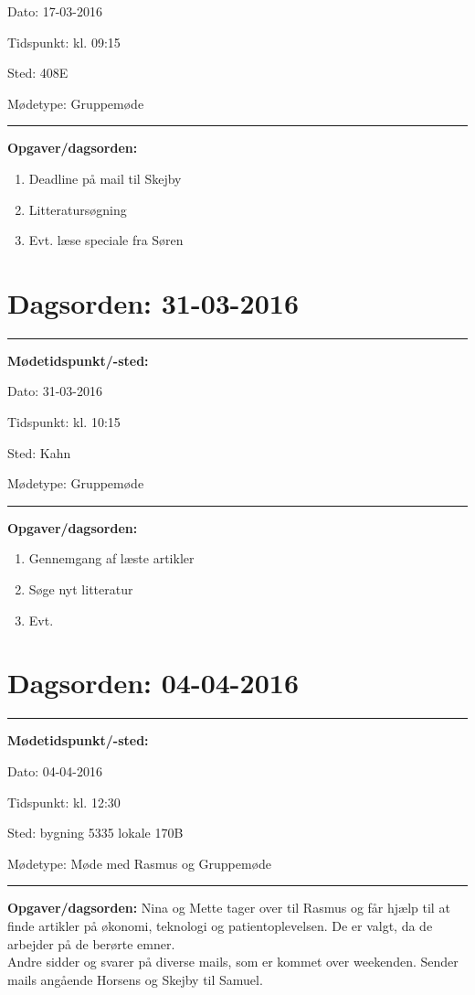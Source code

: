Dato: \tabto{7em} 17-03-2016

Tidspunkt: \tabto{7em} kl. 09:15 

Sted: \tabto{7em} 408E

Mødetype: \tabto{7em} Gruppemøde \newline


\hrule
\textbf{Opgaver/dagsorden:} \newline
\begin{enumerate}
	\item Deadline på mail til Skejby 
	\item Litteratursøgning 
	\item Evt. læse speciale fra Søren
\end{enumerate}

\section{Dagsorden: 31-03-2016 }
\hrule
\textbf{Mødetidspunkt/-sted:} 

Dato: \tabto{7em} 31-03-2016

Tidspunkt: \tabto{7em} kl. 10:15 

Sted: \tabto{7em} Kahn

Mødetype: \tabto{7em} Gruppemøde \newline


\hrule
\textbf{Opgaver/dagsorden:} \newline
\begin{enumerate}
	\item Gennemgang af læste artikler 
	\item Søge nyt litteratur 
	\item Evt. 
\end{enumerate}

\newpage 
\section{Dagsorden: 04-04-2016 }
\hrule
\textbf{Mødetidspunkt/-sted:} 

Dato: \tabto{7em} 04-04-2016

Tidspunkt: \tabto{7em} kl. 12:30 

Sted: \tabto{7em} bygning 5335 lokale 170B

Mødetype: \tabto{7em} Møde med Rasmus og Gruppemøde \newline


\hrule
\textbf{Opgaver/dagsorden:} \newline
Nina og Mette tager over til Rasmus og får hjælp til at finde artikler på økonomi, teknologi og patientoplevelsen. De er valgt, da de arbejder på de berørte emner. \\
Andre sidder og svarer på diverse mails, som er kommet over weekenden. Sender mails angående Horsens og Skejby til Samuel. 

